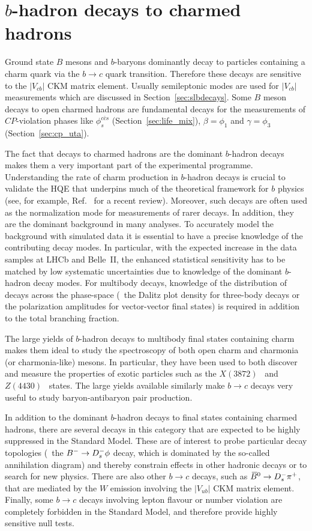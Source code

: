 \section{$b$-hadron decays to charmed hadrons}
\label{sec:b2c}
Ground state $B$ mesons and $b$-baryons dominantly decay to particles containing a charm quark via the $b \rightarrow c$ quark transition.
Therefore these decays are sensitive to the $|V_{cb}|$ CKM matrix element.
Usually semileptonic modes are used for $|V_{cb}|$ measurements which are discussed in Section~\ref{sec:slbdecays}.
Some $B$ meson decays to open charmed hadrons are fundamental decays for the measurements of $CP$-violation phases like $\phi_s^{c\bar{c}s}$ (Section~\ref{sec:life_mix}), $\beta=\phi_1$ and $\gamma=\phi_3$ (Section~\ref{sec:cp_uta}). 

The fact that decays to charmed hadrons are the dominant $b$-hadron decays
makes them a very important part of the experimental programme.
Understanding the rate of charm production in $b$-hadron decays is crucial to
validate the HQE that underpins much of the theoretical framework for $b$
physics (see, for example, Ref.~\cite{Lenz:2014nka} for a recent review).
Moreover, such decays are often used as the normalization mode for
measurements of rarer decays. 
In addition, they are the dominant background in many analyses.
To accurately model the background with simulated data it is essential to have a precise knowledge of the contributing decay modes.
In particular, with the expected increase in the data samples at LHCb and
Belle~II, the enhanced statistical sensitivity has to be matched by low
systematic uncertainties due to knowledge of the dominant $b$-hadron decay
modes. 
For multibody decays, knowledge of the distribution of decays across the
phase-space (\eg\ the Dalitz plot density for three-body decays or the
polarization amplitudes for vector-vector final states) is required in
addition to the total branching fraction.

The large yields of $b$-hadron decays to multibody final states containing
charm makes them ideal to study the spectroscopy of both open charm and
charmonia (or charmonia-like) mesons.  
In particular, they have been used to both discover and measure the properties
of exotic particles such as the $X(3872)$~\cite{Choi:2003ue,Aaij:2013zoa} and
$Z(4430)$~\cite{Choi:2007wga,Aaij:2014jqa} states.
The large yields available similarly make $b \to c$ decays very useful to
study baryon-antibaryon pair production.

In addition to the dominant $b$-hadron decays to final states containing
charmed hadrons, there are several decays in this category that are expected
to be highly suppressed in the Standard Model.
These are of interest to probe particular decay topologies (\eg\ the $B^- \to
D^-_s \phi$ decay, which is dominated by the so-called annihilation diagram)
and thereby constrain effects in other hadronic decays or to search for new physics.
There are also other $b \to c$ decays, such as $\kern 0.18em\overline{\kern -0.18em B}{}^0 \to D^-_s \pi^+$, that are
mediated by the $W$ emission involving the $|V_{ub}|$ CKM matrix element.
Finally, some $b \to c$ decays involving lepton flavour or number violation are
completely forbidden in the Standard Model, and therefore provide highly
sensitive null tests.


